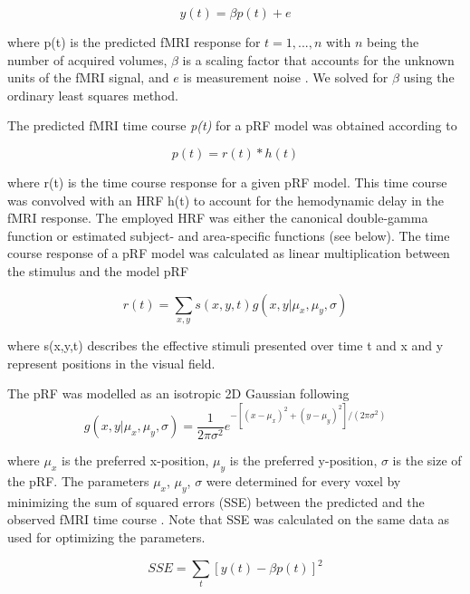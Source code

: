 \begin{equation}
y(t) = \beta p(t) + e
\end{equation}

where p(t) is the predicted fMRI response for $t = {1,..., n}$ with $n$ being the number of acquired volumes, $\beta$ is a scaling factor that accounts for the unknown units of the fMRI signal, and $e$ is measurement noise \parencite{Dumoulin2008}. We solved for $\beta$ using the ordinary least squares method.

The predicted fMRI time course \textit{p(t)} for a pRF model was obtained according to

\begin{equation}
p(t) = r(t) \ast h(t)
\end{equation}

where r(t) is the time course response for a given pRF model. This time course was convolved with an HRF h(t) to account for the hemodynamic delay in the fMRI response. The employed HRF was either the canonical double-gamma function \parencite{Friston1998} or estimated subject- and area-specific functions (see below). The time course response of a pRF model was calculated as linear multiplication between the stimulus and the model pRF

\begin{equation}
r(t) = \sum_{x,y} s(x,y,t) g(x, y|\mu_x,\mu_y,\sigma)
\end{equation}

where s(x,y,t) describes the effective stimuli presented over time t and x and y represent positions in the visual field.

The pRF was modelled as an isotropic 2D Gaussian following
\begin{equation}
g(x, y|\mu_x,\mu_y,\sigma) = \frac{1}{2\pi\sigma^2} e^{-[(x-\mu_x)^2 + (y-\mu_y)^2] / (2\pi\sigma^2)}
\end{equation}

where $\mu_x$ is the preferred x-position, $\mu_y$ is the preferred y-position, $\sigma$ is the size of the pRF. The parameters $\mu_x$, $\mu_y$, $\sigma$ were determined for every voxel by minimizing the sum of squared errors (SSE) between the predicted and the observed fMRI time course \parencite{Dumoulin2008}. Note that SSE was calculated on the same data as used for optimizing the parameters.

\begin{equation}
SSE = \sum_{t}[y(t) - \beta p(t)]^2
\label{eq:SSE}
\end{equation}

